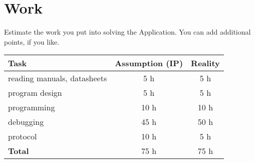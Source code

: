 \documentclass[12pt,a4paper,titlepage,oneside]{article}
\begin{document}
\section{Work}

Estimate the work you put into solving the Application.
You can add additional points, if you like.

\begin{tabular}{|l|c|c|}\hline
	Task & Assumption (IP) & Reality \\ \hline

	reading manuals, datasheets &  5 h &  5 h\\
	program design              &  5 h &  5 h\\
	programming                 & 10 h & 10 h\\
	debugging                   & 45 h & 50 h\\
	protocol                    & 10 h &  5 h\\ \hline

	\textbf{Total}              & 75 h & 75 h\\ \hline
\end{tabular}


\newpage
\end{document}

